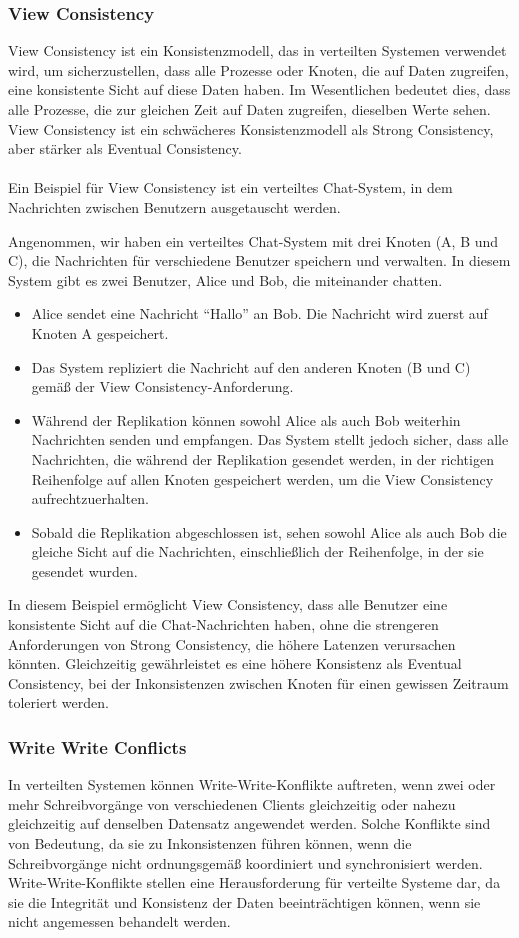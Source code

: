 \subsubsection{View Consistency}

View Consistency ist ein Konsistenzmodell, das in verteilten Systemen verwendet wird, um sicherzustellen, dass alle Prozesse oder Knoten, die auf Daten zugreifen, eine konsistente Sicht auf diese Daten haben. Im Wesentlichen bedeutet dies, dass alle Prozesse, die zur gleichen Zeit auf Daten zugreifen, dieselben Werte sehen. View Consistency ist ein schwächeres Konsistenzmodell als Strong Consistency, aber stärker als Eventual Consistency.
\\\\
Ein  Beispiel für View Consistency ist ein verteiltes Chat-System, in dem Nachrichten zwischen Benutzern ausgetauscht werden.

Angenommen, wir haben ein verteiltes Chat-System mit drei Knoten (A, B und C), die Nachrichten für verschiedene Benutzer speichern und verwalten. In diesem System gibt es zwei Benutzer, Alice und Bob, die miteinander chatten.
\begin{itemize}
\item Alice sendet eine Nachricht \enquote{Hallo} an Bob. Die Nachricht wird zuerst auf Knoten A gespeichert.
\item Das System repliziert die Nachricht auf den anderen Knoten (B und C) gemäß der View Consistency-Anforderung.
\item Während der Replikation können sowohl Alice als auch Bob weiterhin Nachrichten senden und empfangen. Das System stellt jedoch sicher, dass alle Nachrichten, die während der Replikation gesendet werden, in der richtigen Reihenfolge auf allen Knoten gespeichert werden, um die View Consistency aufrechtzuerhalten.
\item Sobald die Replikation abgeschlossen ist, sehen sowohl Alice als auch Bob die gleiche Sicht auf die Nachrichten, einschließlich der Reihenfolge, in der sie gesendet wurden.
\end{itemize}
In diesem Beispiel ermöglicht View Consistency, dass alle Benutzer eine konsistente Sicht auf die Chat-Nachrichten haben, ohne die strengeren Anforderungen von Strong Consistency, die höhere Latenzen verursachen könnten. Gleichzeitig gewährleistet es eine höhere Konsistenz als Eventual Consistency, bei der Inkonsistenzen zwischen Knoten für einen gewissen Zeitraum toleriert werden.

\subsubsection{Write Write Conflicts}
In verteilten Systemen können Write-Write-Konflikte auftreten, wenn zwei oder mehr Schreibvorgänge von verschiedenen Clients gleichzeitig oder nahezu gleichzeitig auf denselben Datensatz angewendet werden. Solche Konflikte sind von Bedeutung, da sie zu Inkonsistenzen führen können, wenn die Schreibvorgänge nicht ordnungsgemäß koordiniert und synchronisiert werden. Write-Write-Konflikte stellen eine Herausforderung für verteilte Systeme dar, da sie die Integrität und Konsistenz der Daten beeinträchtigen können, wenn sie nicht angemessen behandelt werden.


